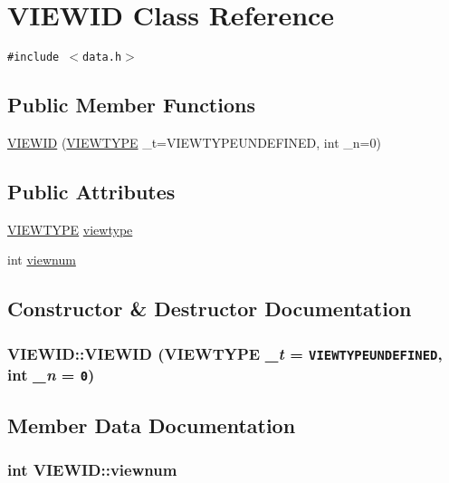 \hypertarget{class_v_i_e_w_i_d}{
\section{VIEWID Class Reference}
\label{class_v_i_e_w_i_d}
}
{\tt \#include $<$data.h$>$}

\subsection*{Public Member Functions}
\begin{CompactItemize}
\item 
\hyperlink{class_v_i_e_w_i_d_7bd037945f9fa94ef3feac0f9f9bfd18}{VIEWID} (\hyperlink{data_8h_df19f45a6b4a54e345761faa6837c333}{VIEWTYPE} \_\-t=VIEWTYPEUNDEFINED, int \_\-n=0)
\end{CompactItemize}
\subsection*{Public Attributes}
\begin{CompactItemize}
\item 
\hyperlink{data_8h_df19f45a6b4a54e345761faa6837c333}{VIEWTYPE} \hyperlink{class_v_i_e_w_i_d_f8882c1dbed41f240794eb70bc2faa18}{viewtype}
\item 
int \hyperlink{class_v_i_e_w_i_d_7db53e6a6520cde871777168aae22cdf}{viewnum}
\end{CompactItemize}


\subsection{Constructor \& Destructor Documentation}
\hypertarget{class_v_i_e_w_i_d_7bd037945f9fa94ef3feac0f9f9bfd18}{
\subsubsection[{VIEWID}]{\setlength{\rightskip}{0pt plus 5cm}VIEWID::VIEWID ({\bf VIEWTYPE} {\em \_\-t} = {\tt VIEWTYPEUNDEFINED}, \/  int {\em \_\-n} = {\tt 0})}}
\label{class_v_i_e_w_i_d_7bd037945f9fa94ef3feac0f9f9bfd18}




\subsection{Member Data Documentation}
\hypertarget{class_v_i_e_w_i_d_7db53e6a6520cde871777168aae22cdf}{
\subsubsection[{viewnum}]{\setlength{\rightskip}{0pt plus 5cm}int {\bf VIEWID::viewnum}}}
\label{class_v_i_e_w_i_d_7db53e6a6520cde871777168aae22cdf}


